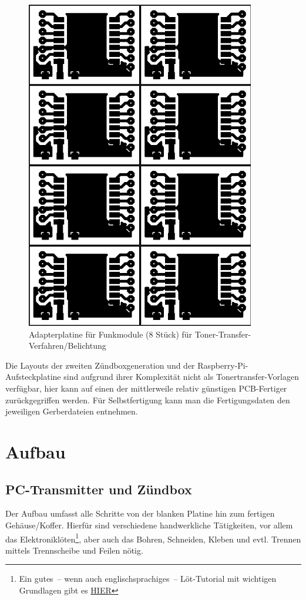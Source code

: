 \documentclass[paper=a4, parskip, numbers=noenddot, toc=listof, headsepline]{scrbook}
\begin{document}
		 \begin{figure}
			 \centering
			 \includegraphics[scale=1]{Bilder/rfm-dil-70x100}
			 \caption{Adapterplatine für Funkmodule (8 Stück) für Toner-Transfer-Verfahren/Belichtung}
			 \label{fig:rfmprint}
		 \end{figure}

		 Die Layouts der zweiten Zündboxgeneration und der Raspberry-Pi-Aufsteckplatine sind aufgrund ihrer Komplexität nicht als Tonertransfer-Vorlagen verfügbar, hier kann auf einen der mittlerweile relativ günstigen PCB-Fertiger zurückgegriffen werden. Für Selbstfertigung kann man die Fertigungsdaten den jeweiligen Gerberdateien entnehmen.

		\chapter{Aufbau}

		 \section{PC-Transmitter und Zündbox}

		  Der Aufbau umfasst alle Schritte von der blanken Platine hin zum fertigen Gehäuse/Koffer. Hierfür sind verschiedene handwerkliche Tätigkeiten, vor allem das Elektroniklöten\footnote{Ein gutes~-- wenn auch englischsprachiges~-- Löt-Tutorial mit wichtigen Grundlagen gibt es \href{https://www.youtube.com/watch?v=I_NU2ruzyc4}{HIER}}, aber auch das Bohren, Schneiden, Kleben und evtl. Trennen mittels Trennscheibe und Feilen nötig.
\end{document}
